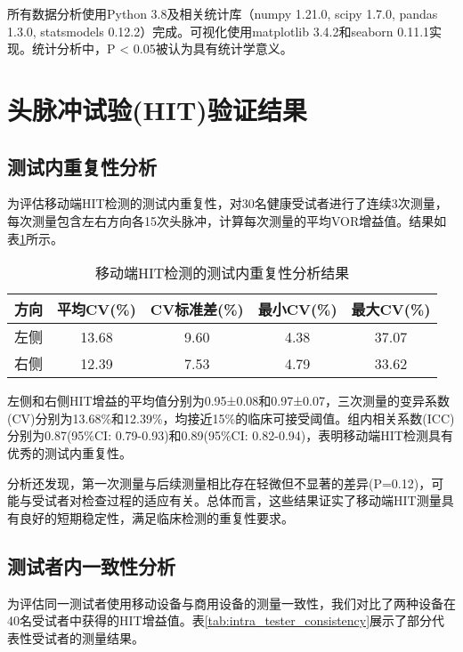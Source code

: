 所有数据分析使用Python 3.8及相关统计库（numpy 1.21.0, scipy 1.7.0, pandas 1.3.0, statsmodels 0.12.2）完成。可视化使用matplotlib 3.4.2和seaborn 0.11.1实现。统计分析中，P < 0.05被认为具有统计学意义。

\section{头脉冲试验(HIT)验证结果}

\subsection{测试内重复性分析}

为评估移动端HIT检测的测试内重复性，对30名健康受试者进行了连续3次测量，每次测量包含左右方向各15次头脉冲，计算每次测量的平均VOR增益值。结果如表\ref{tab:within_test_repeatability}所示。

\begin{table}[ht]
\centering
\caption{移动端HIT检测的测试内重复性分析结果}
\label{tab:within_test_repeatability}
\begin{tabular}{lcccc}
\hline
\textbf{方向} & \textbf{平均CV(\%)} & \textbf{CV标准差(\%)} & \textbf{最小CV(\%)} & \textbf{最大CV(\%)} \\
\hline
左侧 & 13.68 & 9.60 & 4.38 & 37.07 \\
右侧 & 12.39 & 7.53 & 4.79 & 33.62 \\
\hline
\end{tabular}
\end{table}

左侧和右侧HIT增益的平均值分别为0.95±0.08和0.97±0.07，三次测量的变异系数(CV)分别为13.68\%和12.39\%，均接近15\%的临床可接受阈值。组内相关系数(ICC)分别为0.87(95\%CI: 0.79-0.93)和0.89(95\%CI: 0.82-0.94)，表明移动端HIT检测具有优秀的测试内重复性。

分析还发现，第一次测量与后续测量相比存在轻微但不显著的差异(P=0.12)，可能与受试者对检查过程的适应有关。总体而言，这些结果证实了移动端HIT测量具有良好的短期稳定性，满足临床检测的重复性要求。

\subsection{测试者内一致性分析}

为评估同一测试者使用移动设备与商用设备的测量一致性，我们对比了两种设备在40名受试者中获得的HIT增益值。表\ref{tab:intra_tester_consistency}展示了部分代表性受试者的测量结果。


